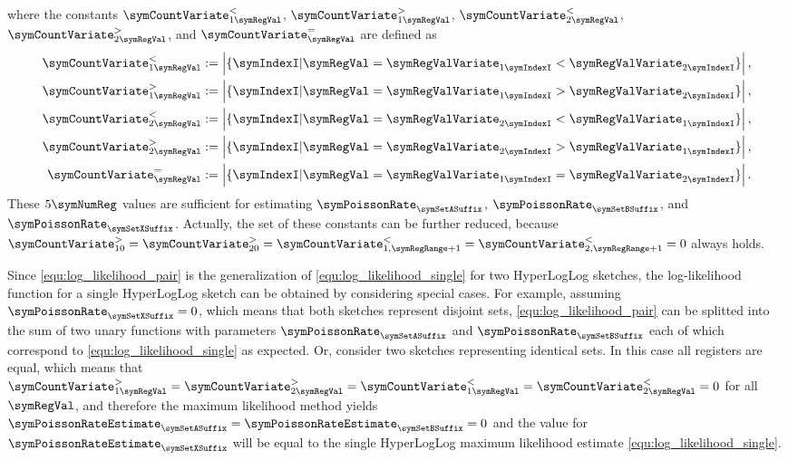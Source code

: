\documentclass[a4paper]{scrartcl}
\begin{document}
where the constants
$\symCountVariate^{<}_{1\symRegVal}$,
$\symCountVariate^{>}_{1\symRegVal}$,
$\symCountVariate^{<}_{2\symRegVal}$,
$\symCountVariate^{>}_{2\symRegVal}$,
and $\symCountVariate^{=}_{\symRegVal}$ are defined as
\begin{equation}
\label{equ:sufficient_joint_statistic}
\begin{aligned}
\symCountVariate^{<}_{1\symRegVal}&:=\left|\lbrace\symIndexI\vert\symRegVal=\symRegValVariate_{1\symIndexI}<
\symRegValVariate_{2\symIndexI}\rbrace\right|,
\\
\symCountVariate^{>}_{1\symRegVal}&:=\left|\lbrace\symIndexI\vert\symRegVal=\symRegValVariate_{1\symIndexI}>
\symRegValVariate_{2\symIndexI}\rbrace\right|,
\\
\symCountVariate^{<}_{2\symRegVal}&:=\left|\lbrace\symIndexI\vert\symRegVal=\symRegValVariate_{2\symIndexI}<
\symRegValVariate_{1\symIndexI}\rbrace\right|,
\\
\symCountVariate^{>}_{2\symRegVal}&:=\left|\lbrace\symIndexI\vert\symRegVal=\symRegValVariate_{2\symIndexI}>
\symRegValVariate_{1\symIndexI}\rbrace\right|,
\\
\symCountVariate^{=}_{\symRegVal}&:=\left|\lbrace\symIndexI\vert\symRegVal=\symRegValVariate_{1\symIndexI}=
\symRegValVariate_{2\symIndexI}\rbrace\right|.
\end{aligned}
\end{equation}
These $5\symNumReg$ values are sufficient for estimating $\symPoissonRate_\symSetASuffix$, $\symPoissonRate_\symSetBSuffix$, and $\symPoissonRate_\symSetXSuffix$. Actually, the set of these constants can be further reduced, because $\symCountVariate^{>}_{10}=\symCountVariate^{>}_{20}=
\symCountVariate^{<}_{1,\symRegRange+1}=\symCountVariate^{<}_{2,\symRegRange+1}=0$
always holds.

Since \eqref{equ:log_likelihood_pair} is the generalization of \eqref{equ:log_likelihood_single} for two HyperLogLog sketches, the log-likelihood function for a single HyperLogLog sketch can be obtained by considering special cases. For example, assuming $\symPoissonRate_\symSetXSuffix=0$, which means that both sketches represent disjoint sets, \eqref{equ:log_likelihood_pair} can be splitted into the sum of two unary functions with parameters $\symPoissonRate_\symSetASuffix$ and $\symPoissonRate_\symSetBSuffix$ each of which correspond to \eqref{equ:log_likelihood_single} as expected. Or, consider two sketches representing identical sets. In this case all registers are equal, which means  that $\symCountVariate^{>}_{1\symRegVal}=\symCountVariate^{>}_{2\symRegVal}=
\symCountVariate^{<}_{1\symRegVal}=\symCountVariate^{<}_{2\symRegVal}=0$ for all $\symRegVal$, and therefore the maximum likelihood method yields $\symPoissonRateEstimate_\symSetASuffix = \symPoissonRateEstimate_\symSetBSuffix = 0$ and the value for $\symPoissonRateEstimate_\symSetXSuffix$ will be equal to the single HyperLogLog maximum likelihood estimate \eqref{equ:log_likelihood_single}.
\end{document}
